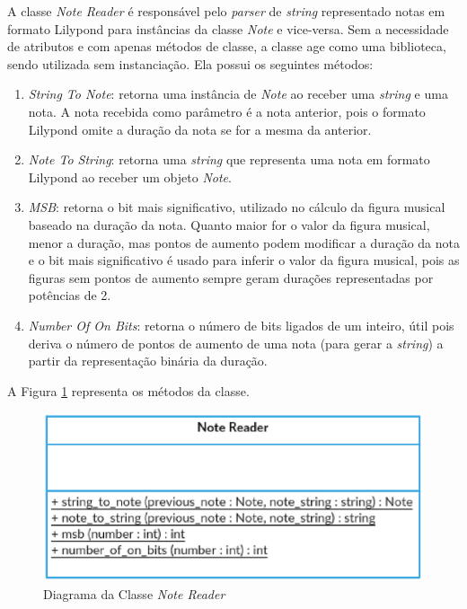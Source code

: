       A classe \textit{Note Reader} é responsável pelo \textit{parser} de \textit{string} representado notas em formato Lilypond para instâncias da classe \textit{Note} e vice-versa. Sem a necessidade de atributos e com apenas métodos de classe, a classe age como uma biblioteca, sendo utilizada sem instanciação. Ela possui os seguintes métodos:


      \begin{enumerate}
        \item \textit{String To Note}: retorna uma instância de \textit{Note} ao receber uma \textit{string} e uma nota. A nota recebida como parâmetro é a nota anterior, pois o formato Lilypond omite a duração da nota se for a mesma da anterior.
        \item \textit{Note To String}: retorna uma \textit{string} que representa uma nota em formato Lilypond ao receber um objeto \textit{Note}.
        \item \textit{MSB}: retorna o bit mais significativo, utilizado no cálculo da figura musical baseado na duração da nota. Quanto maior for o valor da figura musical, menor a duração, mas pontos de aumento podem modificar a duração da nota e o bit mais significativo é usado para inferir o valor da figura musical, pois as figuras sem pontos de aumento sempre geram durações representadas por potências de 2.
        \item \textit{Number Of On Bits}: retorna o número de bits ligados de um inteiro, útil pois deriva o número de pontos de aumento de uma nota (para gerar a \textit{string}) a partir da representação binária da duração.
      \end{enumerate}

      A Figura \ref{notereaderclass} representa os métodos da classe.

      \begin{figure}[htb]
        \centering
        \includegraphics[scale=0.8]{figuras/notereaderclass.eps}
        \caption{Diagrama da Classe \textit{Note Reader}}
        \label{notereaderclass}
      \end{figure}

